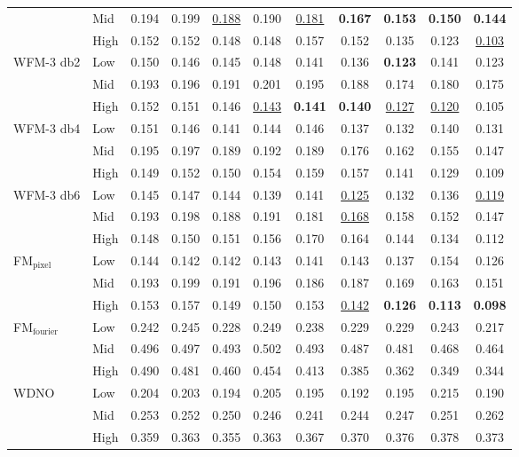 \begin{table}[ht]
{\begin{tabular}{llccccccccc}
 & Mid & 0.194 & 0.199 & \underline{0.188} & 0.190 & \underline{0.181} & \textbf{0.167} & \textbf{0.153} & \textbf{0.150} & \textbf{0.144} \\
 & High & 0.152 & 0.152 & 0.148 & 0.148 & 0.157 & 0.152 & 0.135 & 0.123 & \underline{0.103} \\
\midrule
\multirow{3}{*}{WFM-3 db2} & Low & 0.150 & 0.146 & 0.145 & 0.148 & 0.141 & 0.136 & \textbf{0.123} & 0.141 & 0.123 \\
 & Mid & 0.193 & 0.196 & 0.191 & 0.201 & 0.195 & 0.188 & 0.174 & 0.180 & 0.175 \\
 & High & 0.152 & 0.151 & 0.146 & \underline{0.143} & \textbf{0.141} & \textbf{0.140} & \underline{0.127} & \underline{0.120} & 0.105 \\
\midrule
\multirow{3}{*}{WFM-3 db4} & Low & 0.151 & 0.146 & 0.141 & 0.144 & 0.146 & 0.137 & 0.132 & 0.140 & 0.131 \\
 & Mid & 0.195 & 0.197 & 0.189 & 0.192 & 0.189 & 0.176 & 0.162 & 0.155 & 0.147 \\
 & High & 0.149 & 0.152 & 0.150 & 0.154 & 0.159 & 0.157 & 0.141 & 0.129 & 0.109 \\
\midrule
\multirow{3}{*}{WFM-3 db6} & Low & 0.145 & 0.147 & 0.144 & 0.139 & 0.141 & \underline{0.125} & 0.132 & 0.136 & \underline{0.119} \\
 & Mid & 0.193 & 0.198 & 0.188 & 0.191 & 0.181 & \underline{0.168} & 0.158 & 0.152 & 0.147 \\
 & High & 0.148 & 0.150 & 0.151 & 0.156 & 0.170 & 0.164 & 0.144 & 0.134 & 0.112 \\
\midrule
\multirow{3}{*}{FM$_\text{pixel}$} & Low & 0.144 & 0.142 & 0.142 & 0.143 & 0.141 & 0.143 & 0.137 & 0.154 & 0.126 \\
 & Mid & 0.193 & 0.199 & 0.191 & 0.196 & 0.186 & 0.187 & 0.169 & 0.163 & 0.151 \\
 & High & 0.153 & 0.157 & 0.149 & 0.150 & 0.153 & \underline{0.142} & \textbf{0.126} & \textbf{0.113} & \textbf{0.098} \\
\midrule
\multirow{3}{*}{FM$_\text{fourier}$} & Low & 0.242 & 0.245 & 0.228 & 0.249 & 0.238 & 0.229 & 0.229 & 0.243 & 0.217 \\
 & Mid & 0.496 & 0.497 & 0.493 & 0.502 & 0.493 & 0.487 & 0.481 & 0.468 & 0.464 \\
 & High & 0.490 & 0.481 & 0.460 & 0.454 & 0.413 & 0.385 & 0.362 & 0.349 & 0.344 \\
\midrule
\multirow{3}{*}{WDNO} & Low & 0.204 & 0.203 & 0.194 & 0.205 & 0.195 & 0.192 & 0.195 & 0.215 & 0.190 \\
 & Mid & 0.253 & 0.252 & 0.250 & 0.246 & 0.241 & 0.244 & 0.247 & 0.251 & 0.262 \\
 & High & 0.359 & 0.363 & 0.355 & 0.363 & 0.367 & 0.370 & 0.376 & 0.378 & 0.373 \\
\bottomrule
\end{tabular}
}
\end{table}
